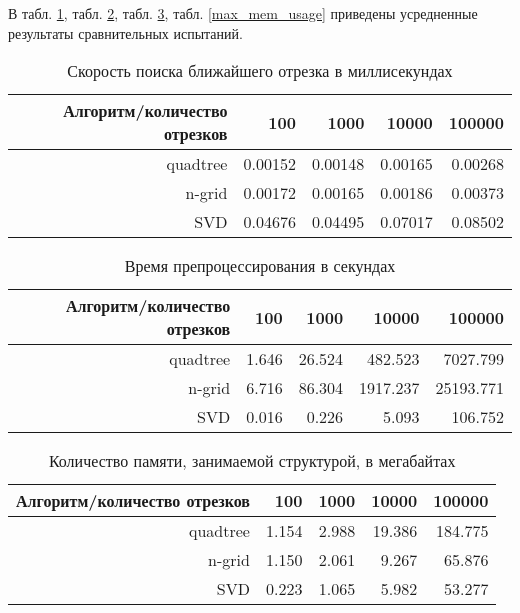 В табл. \ref{query_time}, табл. \ref{preproc_time}, табл. \ref{mem_usage}, табл. \ref{max_mem_usage}
приведены усредненные результаты сравнительных испытаний.

\begin{table}[ht]
\centering
\begin{tabular}{|r|r|r|r|r|}
\hline
Алгоритм/количество отрезков & 100 & 1000 & 10000 & 100000 \\
\hline
quadtree & 0.00152 & 0.00148 & 0.00165 & 0.00268 \\
n-grid   & 0.00172 & 0.00165 & 0.00186 & 0.00373 \\
SVD      & 0.04676 & 0.04495 & 0.07017 & 0.08502 \\
\hline

\end{tabular}
\caption{Скорость поиска ближайшего отрезка в миллисекундах}
\label{query_time}
\end{table}

\begin{table}[ht]
\centering
\begin{tabular}{|r|r|r|r|r|}

\hline
Алгоритм/количество отрезков & 100 & 1000 & 10000 & 100000 \\
\hline
quadtree & 1.646 & 26.524 &  482.523 &  7027.799 \\
n-grid   & 6.716 & 86.304 & 1917.237 & 25193.771 \\
SVD      & 0.016 &  0.226 &    5.093 &   106.752 \\
\hline

\end{tabular}
\caption{Время препроцессирования в секундах}
\label{preproc_time}
\end{table}

\begin{table}[ht]
\centering
\begin{tabular}{|r|r|r|r|r|}

\hline
Алгоритм/количество отрезков & 100 & 1000 & 10000 & 100000 \\
\hline
quadtree & 1.154 & 2.988 & 19.386 & 184.775 \\
n-grid   & 1.150 & 2.061 &  9.267 &  65.876 \\
SVD      & 0.223 & 1.065 &  5.982 &  53.277 \\
\hline
\end{tabular}
\caption{Количество памяти, занимаемой структурой, в мегабайтах}
\label{mem_usage}
\end{table}


